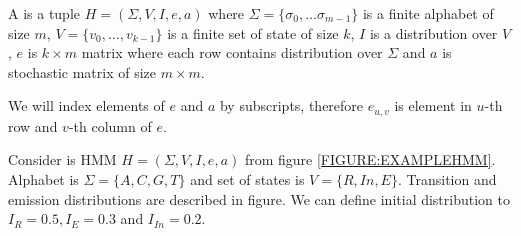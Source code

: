 \begin{definition}\label{DEF:HMM}
A  is a tuple $H=(\Sigma,V,I,e,a)$ where
$\Sigma=\{\sigma_0,\dots\sigma_{m-1}\}$ is a finite alphabet of size $m$,
$V=\{v_0,\dots,v_{k-1}\}$ is a finite set of state of size $k$, $I$ is
a distribution over $V$, $e$ is $k\times m$ matrix where each row contains
distribution over $\Sigma$ and $a$ is stochastic matrix of size $m\times m$.

We will index elements of $e$ and $a$ by subscripts, therefore $e_{u,v}$ is
element in $u$-th row and $v$-th column of $e$.  

\end{definition}

\begin{example}\label{EXAMPLE:EXAMPLEHMM} Consider is HMM $H=(\Sigma,V,I,e,a)$ from figure
\ref{FIGURE:EXAMPLEHMM}.  Alphabet is $\Sigma=\{A,C,G,T\}$ and set of states is
$V=\{R,In,E\}$.  Transition and emission distributions are described in figure.
We can define initial distribution to $I_R=0.5, I_E=0.3$ and $I_{In}=0.2$.

\end{example}

